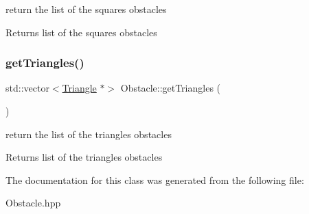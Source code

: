 return the list of the squares obstacles \begin{DoxyReturn}{Returns}
list of the squares obstacles 
\end{DoxyReturn}
\mbox{\label{class_obstacle_ae4541d52e558b0995203e99d09d4d5d6}} 
\subsubsection{\texorpdfstring{get\+Triangles()}{getTriangles()}}
{\footnotesize\ttfamily std\+::vector$<$\mbox{\hyperlink{class_triangle}{Triangle}} $\ast$$>$ Obstacle\+::get\+Triangles (\begin{DoxyParamCaption}{ }\end{DoxyParamCaption})}

return the list of the triangles obstacles \begin{DoxyReturn}{Returns}
list of the triangles obstacles 
\end{DoxyReturn}


The documentation for this class was generated from the following file\+:\begin{DoxyCompactItemize}
\item 
Obstacle.\+hpp\end{DoxyCompactItemize}
